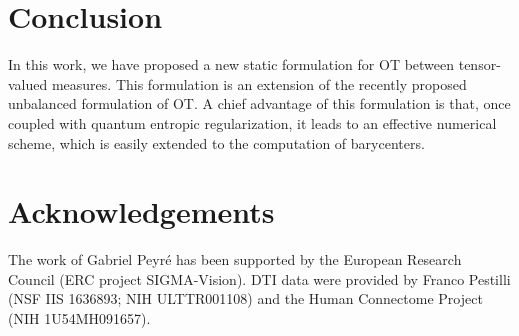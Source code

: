 
\section{Conclusion}

In this work, we have proposed a new static formulation for OT between tensor-valued measures. This formulation is an extension of the recently proposed unbalanced formulation of OT. A chief advantage of this formulation is that, once coupled with quantum entropic regularization, it leads to an effective numerical scheme, which is easily extended to the computation of barycenters. 


\section*{Acknowledgements}

The work of Gabriel Peyr\'e has been supported by the European Research Council (ERC project SIGMA-Vision). 
%
DTI data were provided by Franco Pestilli (NSF IIS 1636893; NIH ULTTR001108) and the Human Connectome Project (NIH 1U54MH091657). 